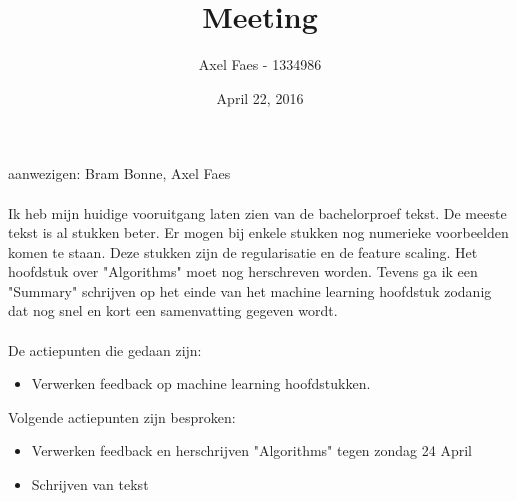 \documentclass[notitlepage]{article}
\title{Meeting}
\author{Axel Faes - 1334986}
\date{April 22, 2016}
\begin{document}
\maketitle

aanwezigen: Bram Bonne, Axel Faes \\
\\
Ik heb mijn huidige vooruitgang laten zien van de bachelorproef tekst. De meeste tekst is al stukken beter. Er mogen bij enkele stukken nog numerieke voorbeelden komen te staan. Deze stukken zijn de regularisatie en de feature scaling. Het hoofdstuk over "Algorithms" moet nog herschreven worden. Tevens ga ik een "Summary" schrijven op het einde van het machine learning hoofdstuk zodanig dat nog snel en kort een samenvatting gegeven wordt.\\
\\
De actiepunten die gedaan zijn:
\begin{itemize}  
        \item  Verwerken feedback op machine learning hoofdstukken.
\end{itemize}

Volgende actiepunten zijn besproken:
\begin{itemize}  		
		\item Verwerken feedback en herschrijven "Algorithms" tegen zondag 24 April
        \item Schrijven van tekst
\end{itemize}
\end{document}
